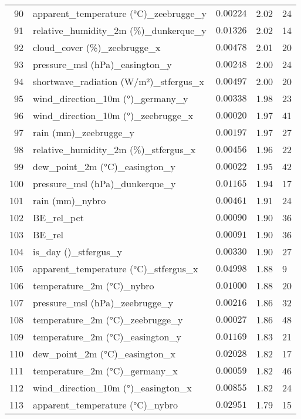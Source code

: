 \begin{table}[H]
\begin{tabular}{r l l l l}
        90 & apparent\_temperature (°C)\_zeebrugge\_y & $0.00224$ & 2.02 & 24 \\
        91 & relative\_humidity\_2m (\%)\_dunkerque\_y & $0.01326$ & 2.02 & 14 \\
        92 & cloud\_cover (\%)\_zeebrugge\_x & $0.00478$ & 2.01 & 20 \\
        93 & pressure\_msl (hPa)\_easington\_y & $0.00248$ & 2.00 & 24 \\
        94 & shortwave\_radiation (W/m²)\_stfergus\_x & $0.00497$ & 2.00 & 20 \\
        95 & wind\_direction\_10m (°)\_germany\_y & $0.00338$ & 1.98 & 23 \\
        96 & wind\_direction\_10m (°)\_zeebrugge\_x & $0.00020$ & 1.97 & 41 \\
        97 & rain (mm)\_zeebrugge\_y & $0.00197$ & 1.97 & 27 \\
        98 & relative\_humidity\_2m (\%)\_stfergus\_x & $0.00456$ & 1.96 & 22 \\
        99 & dew\_point\_2m (°C)\_easington\_y & $0.00022$ & 1.95 & 42 \\
        100 & pressure\_msl (hPa)\_dunkerque\_y & $0.01165$ & 1.94 & 17 \\
        101 & rain (mm)\_nybro & $0.00461$ & 1.91 & 24 \\
        102 & BE\_rel\_pct & $0.00090$ & 1.90 & 36 \\
        103 & BE\_rel & $0.00091$ & 1.90 & 36 \\
        104 & is\_day ()\_stfergus\_y & $0.00330$ & 1.90 & 27 \\
        105 & apparent\_temperature (°C)\_stfergus\_x & $0.04998$ & 1.88 & 9 \\
        106 & temperature\_2m (°C)\_nybro & $0.01000$ & 1.88 & 20 \\
        107 & pressure\_msl (hPa)\_zeebrugge\_y & $0.00216$ & 1.86 & 32 \\
        108 & temperature\_2m (°C)\_zeebrugge\_y & $0.00027$ & 1.86 & 48 \\
        109 & temperature\_2m (°C)\_easington\_y & $0.01169$ & 1.83 & 21 \\
        110 & dew\_point\_2m (°C)\_easington\_x & $0.02028$ & 1.82 & 17 \\
        111 & temperature\_2m (°C)\_germany\_x & $0.00059$ & 1.82 & 46 \\
        112 & wind\_direction\_10m (°)\_easington\_x & $0.00855$ & 1.82 & 24 \\
        113 & apparent\_temperature (°C)\_nybro & $0.02951$ & 1.79 & 15 \\

\end{tabular}
\end{table}
